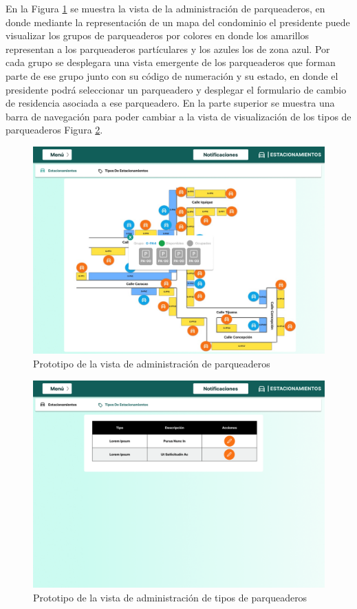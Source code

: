 En la Figura \ref{fig:parqueaderos} se muestra la vista de la administración de parqueaderos, en donde mediante la representación de un mapa del condominio el presidente puede visualizar los grupos de parqueaderos por colores en donde los amarillos representan a los parqueaderos partículares y los azules los de zona azul.
Por cada grupo se desplegara una vista emergente de los parqueaderos que forman parte de ese grupo junto con su código de numeración y su estado,
en donde el presidente podrá seleccionar un parqueadero y desplegar el formulario de cambio de residencia asociada a ese parqueadero.
En la parte superior se muestra una barra de navegación para poder cambiar a la vista de visualización de los tipos de parqueaderos Figura \ref{fig:parqueaderos tipos}.
\begin{figure}[H]
    \centering
    \includegraphics[width=1\textwidth]{resources/images/estacionamientos-organization}
    \caption{Prototipo de la vista de administración de parqueaderos}
    \label{fig:parqueaderos}
\end{figure}

\begin{figure}[H]
    \centering
    \includegraphics[width=1\textwidth]{resources/images/estacionamientos- type}
    \caption{Prototipo de la vista de administración de tipos de parqueaderos}
    \label{fig:parqueaderos tipos}
\end{figure}

